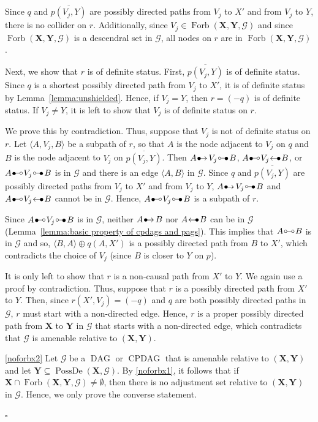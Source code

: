 \documentclass[11pt,a4paper]{article}
\newenvironment{proofof}[1][]{\begin{trivlist}
   \item[\hskip \labelsep {\bfseries Proof of #1.}]}{\hfill{}$\square$\end{trivlist}}
\DeclareMathOperator{\CPDAG}{CPDAG}
\DeclareMathOperator{\DAG}{DAG}
\DeclareMathOperator{\PossDe}{PossDe}
\DeclareMathOperator{\Forbi}{Forb}
\newcommand{\g}[1][G]{\mathcal{#1}}
\newcommand{\fb}[2][X,Y]{\Forbi(\mathbf{#1},#2)}%
\newcommand{\bulletcirc}{
  \setlength{\unitlength}{1mm}
  \begin{picture}(5,1)(0,0)
    \put(0.2,0){$\bullet$}
    \put(1.1, 1){\line(1,0){2.4}}
    \put(4, 1){\circle{1}}
  \end{picture}
}
\newcommand{\circbullet}{
  \setlength{\unitlength}{1mm}
  \begin{picture}(5,1)(0,0)
    \put(1,1){\circle{1}}
    \put(1.5,1){\line(1,0){2.4}}
    \put(2.9,0){$\bullet$}
  \end{picture}
}
\newcommand{\bulletarrow}{
  \setlength{\unitlength}{1mm}
  \begin{picture}(5,1)(0,0)
    \put(0.2,0){$\bullet$}
    \put(1,0){$\rightarrow$}
  \end{picture}
}
\newcommand{\arrowbullet}{
  \setlength{\unitlength}{1mm}
  \begin{picture}(5,1)(0,0)
    \put(0.2,0){$\leftarrow$}
    \put(3,0){$\bullet$}
  \end{picture}
}
\newcommand{\circcirc}{
  \setlength{\unitlength}{1mm}
  \begin{picture}(5,1)(0,0)
    \put(1,1){\circle{1}}
    \put(1.5,1){\line(1,0){2}}
    \put(4,1){\circle{1}}
  \end{picture}
}
\begin{document}
\begin{proofof}[Corollary~\ref{cor:noforbx}]
Since $q$ and $\overline{p(V_j,Y)}$ are possibly directed paths from $V_j$ to $X'$ and from $V_j$ to $Y$, there is no collider on $r$. Additionally, since $V_j \in \fb{\g}$ and since $\fb{\g}$ is a descendral set in $\g$, all nodes on $r$ are in $\fb{\g}$. 

Next, we show that $r$ is of definite status. First, $\overline{p(V_j,Y)}$ is of definite status.
Since $q$ is a shortest possibly directed path from $V_j$ to $X'$, it is of definite status by Lemma~\ref{lemma:unshielded}. Hence, if $V_j = Y$,  then $r = (-q)$ is of definite status. If $V_j \neq Y$, it is left to show that $V_j$ is of definite status on $r$.

We prove this by contradiction. Thus, suppose that $V_j$ is not of definite status on $r$. Let $\langle A,V_j,B \rangle$ be a subpath of $r$, so that $A$ is the node adjacent to $V_j$ on $q$ and $B$ is the node adjacent to $V_j$ on $\overline{p(V_j,Y)}$. Then $A \bulletarrow V_j \circbullet B$, $A \bulletcirc V_j \arrowbullet B$, or $A \bulletcirc V_j \circbullet B$ is in $\g$ and there is an edge $\langle A, B\rangle$ in $\g$. Since $q$ and $\overline{p(V_j,Y)}$ are possibly directed paths from $V_j$ to $X'$ and from $V_j$ to $Y$, $A \bulletarrow V_j \circbullet B$ and $A \bulletcirc V_j \arrowbullet B$ cannot be in $\g$. Hence, $A \bulletcirc V_j \circbullet B$ is a subpath of $r$.

Since $A \bulletcirc V_j \circbullet B$ is in $\g$, neither $A \bulletarrow B$ nor $A \arrowbullet B$ can be in $\g$ (Lemma~\ref{lemma:basic property of cpdags and pags}). This implies that $A \circcirc B$ is in $\g$ and so, $\langle B,A \rangle \oplus q(A,X')$ is a possibly directed path from $B$ to $X'$, which contradicts the choice of $V_{j}$ (since $B$ is closer to $Y$ on $p$). 

It is only left to show that $r$ is a non-causal path from $X'$ to $Y$. We again use a proof by contradiction. Thus, suppose that $r$ is a possibly directed path from $X'$ to $Y$. Then, since $r(X',V_j) = (-q)$ and $q$ are both possibly directed paths in $\g$, $r$ must start with a non-directed edge. Hence, $r$ is a proper possibly directed path from $\mathbf{X}$ to $\mathbf{Y}$ in $\g$ that starts with a non-directed edge, which contradicts that $\g$ is amenable relative to $(\mathbf{X,Y})$.

\ref{noforbx2} Let $\g$ be a $\DAG$ or $\CPDAG$ that is amenable relative to $(\mathbf{X,Y})$ and let $\mathbf{Y} \subseteq \PossDe(\mathbf{X},\g)$. By \ref{noforbx1}, it follows that if $\mathbf{X} \cap \fb{\g} \neq \emptyset$, then there is no adjustment set relative to $(\mathbf{X,Y})$ in $\g$. Hence, we only prove the converse statement.  


\end{proofof}
\end{document}
